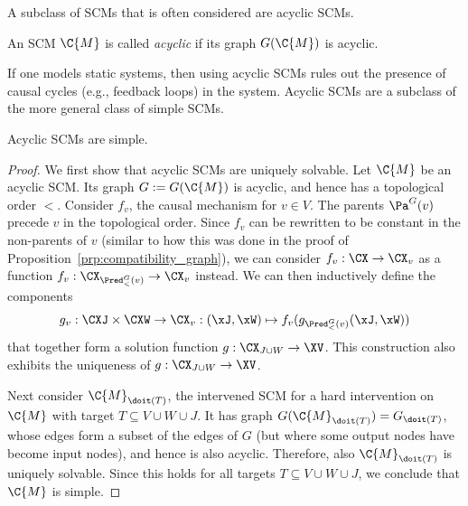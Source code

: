 A subclass of SCMs that is often considered are acyclic SCMs.
\begin{Def}
  An SCM $\C{M}$ is called \emph{acyclic} if its graph $G(\C{M})$ is acyclic.
\end{Def}
If one models static systems, then using acyclic SCMs
rules out the presence of causal cycles (e.g., feedback loops) in the system.
Acyclic SCMs are a subclass of the more general class of simple SCMs.
\begin{Prp}
  Acyclic SCMs are simple.
\end{Prp}
\begin{proof}
  We first show that acyclic SCMs are uniquely solvable. Let $\C{M}$ be an acyclic SCM. Its
  graph $G := G(\C{M})$ is acyclic, and hence has a topological order $<$. Consider $f_v$, the
  causal mechanism for $v \in V$. The parents $\Pa^G(v)$ precede $v$ in the topological order.
  Since $f_v$ can be rewritten to be constant in the non-parents of $v$ (similar to how this
  was done in the proof of Proposition~\ref{prp:compatibility_graph}), 
  we can consider $f_v : \CX \to \CX_v$ as a function
  $f_v : \CX_{\Pred_<^{G}(v)} \to \CX_v$ instead. We can then inductively define the components
  $$g_v : \CXJ \times \CXW \to \CX_v : 
    (\xJ,\xW) \mapsto f_v(g_{\Pred_<^{G}(v)}(\xJ,\xW))$$
  that together form a solution function $g : \CX_{J\cup W} \to \XV$.
  This construction also exhibits the uniqueness of $g : \CX_{J\cup W} \to \XV$.

  Next consider $\C{M}_{\doit(T)}$, the intervened SCM for a hard intervention on $\C{M}$ with target $T \subseteq V \cup W \cup J$. 
  It has graph $G(\C{M}_{\doit(T)}) = G_{\doit(T)}$, whose edges form a subset of the edges of $G$ (but
  where some output nodes have become input nodes), and hence is also acyclic. 
  Therefore, also $\C{M}_{\doit(T)}$ is uniquely solvable. Since this holds for all targets $T \subseteq V \cup W \cup J$,
  we conclude that $\C{M}$ is simple.
\end{proof}

